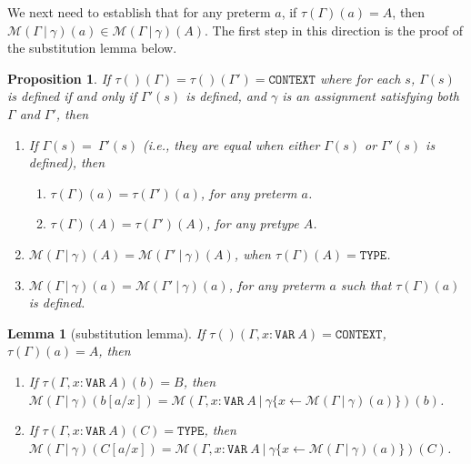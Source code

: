 \documentclass [12pt,twoside]{cslreport}
\newtheorem{prop}[thm]{Proposition}
\newcommand{\tauGamma}[1]{\tau(\Gamma)(#1)}
\newcommand{\Mgamma}[1]{{\mathcal M}(\Gamma\vbar\gamma)(#1)}
\newcommand{\tttype}{\mathtt{TYPE}}
\newcommand{\ttcontext}{\mathtt{CONTEXT}}
\newcommand{\ttvar}{\mathtt{VAR}}
\newcommand{\vbar}{\ |\ }
\newtheorem{lemma}{Lemma}
\begin{document}
We next need to establish that for any preterm $a$,
if $\tauGamma{a} = A$, then $\Mgamma{a}\in \Mgamma{A}$\@.
The first step in this direction is the proof of the substitution lemma
below.
\begin{prop}\label{context-equivalence}
If $\tau()(\Gamma) = \tau()(\Gamma') = \ttcontext$ where
for each $s$, $\Gamma(s)$ is defined if and only if  $\Gamma'(s)$ is defined, and 
$\gamma$ is an assignment satisfying both $\Gamma$ and $\Gamma'$,
then
\begin{enumerate}
\item If  $\Gamma(s) = \ \Gamma'(s)$ (i.e., they are equal when
either $\Gamma(s)$ or $\Gamma'(s)$ is defined), then 
\begin{enumerate}
\item $\tau(\Gamma)(a) = \tau(\Gamma')(a)$, for any preterm $a$.
\item $\tau(\Gamma)(A) = \tau(\Gamma')(A)$, for any pretype $A$.
\end{enumerate}

\item $\Mgamma{A} = \mathcal{M}(\Gamma'\vbar\gamma)(A)$, when $\tauGamma{A} =
\tttype$.

\item $\Mgamma{a} = \mathcal{M}(\Gamma'\vbar\gamma)(a)$, for any preterm $a$
such that $\tauGamma{a}$ is defined.
\end{enumerate}
\end{prop}
%
\begin{lemma}[substitution lemma]\label{substitution-lemma}
If $\tau()(\Gamma, x:\ttvar~A) = \ttcontext$,
$\tauGamma{a} = A$, then
\begin{enumerate}
\item If $\tau(\Gamma, x: \ttvar~A)(b) = B$, then\\
$\Mgamma{b[a/x]} = \mathcal{M}(\Gamma, x:\ttvar~A\vbar \gamma\{x\gets
\Mgamma{a}\})(b)$.

\item If $\tau(\Gamma, x: \ttvar~A)(C) = \tttype$, then\\
$\Mgamma{C[a/x]} = \mathcal{M}(\Gamma, x:\ttvar~A\vbar \gamma\{x\gets
\Mgamma{a}\})(C)$\@. 
\end{enumerate}
\end{lemma}
\end{document}
